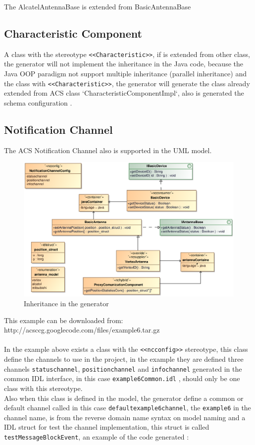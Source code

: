 The AlcatelAntennaBase is extended from BasicAntennaBase
\subsection{Characteristic Component}
A class with the stereotype \verb+<<Characteristic>>+, if is extended from
other class, the generator will not implement the inheritance in the Java code,
because the Java OOP paradigm not support multiple inheritance (parallel
inheritance) and the class with \verb+<<Characteristic>>+, the generator will
generate the class already extended from ACS class
`CharacteristicComponentImpl`, also is generated the schema configuration .

\subsection{Notification Channel} 
 
 The ACS Notification Channel also is supported in the UML model.
 
 \begin{figure}[h!t]
\begin{center}
\includegraphics[scale=0.88]{images/example6}
\caption{\label{fig:vs_diag}Inheritance in the generator}
\end{center}
\end{figure}
 
This example can be downloaded from:
http://acsccg.googlecode.com/files/example6.tar.gz\\
\\
In the example above exists a class with the \verb+<<ncconfig>>+ stereotype,
this class define the channels to use in the project, in the example they are
defined three channels \verb+statuschannel+, \verb+positionchannel+ and
\verb+infochannel+ generated in the common IDL interface, in this case
\verb+example6Common.idl+ , should only be one class with this stereotype.
\\
Also when this class is defined in the model, the generator define a common or
default channel called in this case \verb+defaultexample6channel+, the
\verb+example6+ in the channel name, is from the reverse domain name syntax on
model naming and a IDL struct for test the channel implementation, this struct
is called \verb+testMessageBlockEvent+, an example of the code generated :

